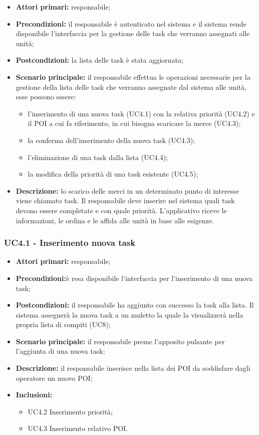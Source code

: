 \begin{itemize}
	\item 	\textbf{Attori primari:} responsabile;
	\item 	\textbf{Precondizioni:} il responsabile è autenticato nel sistema e il sistema rende disponibile l’interfaccia per la gestione delle task che verranno assegnati alle unità;
	\item 	\textbf{Postcondizioni:} la lista delle task è stata aggiornata;
	\item 	\textbf{Scenario principale:} il responsabile effettua le operazioni necessarie per la gestione della lista delle task che verranno assegnate dal sistema alle unità, esse possono essere:
	\begin{itemize}
		\item l’inserimento di una nuova task (UC4.1) con la relativa priorità (UC4.2) e il POI a cui fa riferimento, in cui bisogna scaricare la merce (UC4.3);
		\item la conferma dell’inserimento della nuova task (UC4.3);
		\item l’eliminazione di una task dalla lista (UC4.4);
		\item la modifica della priorità di una task esistente (UC4.5);
	\end{itemize}
	\item 	\textbf{Descrizione:} lo scarico delle merci in un determinato punto di interesse viene chiamato task. Il responsabile deve inserire nel sistema quali task devono essere completate e con quale priorità. L’applicativo riceve le informazioni, le ordina e le affida alle unità in base alle esigenze. 

\end{itemize}

\subsubsection{UC4.1 - Inserimento nuova task}
\begin{itemize}
	\item 	\textbf{Attori primari:} responsabile;
	\item 	\textbf{Precondizioni:}è resa disponibile l’interfaccia per l’inserimento di una nuova task;
	\item 	\textbf{Postcondizioni:} il responsabile ha aggiunto con successo la task alla lista. Il sistema assegnerà la nuova task a un muletto la quale la visualizzerà nella propria lista di compiti (UC8);
	\item 	\textbf{Scenario principale:} il responsabile preme l’apposito pulsante per l’aggiunta di una nuova task; 
	\item 	\textbf{Descrizione:} il responsabile inserisce nella lista dei POI da soddisfare dagli operatore un nuovo POI;
	\item 	\textbf{Inclusioni:}
	\begin{itemize}
		\item UC4.2 Inserimento priorità;
		\item UC4.3 Inserimento relativo POI.
	\end{itemize}
\end{itemize}


